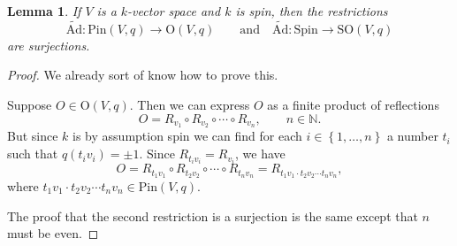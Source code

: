\documentclass[a4paper,10pt]{scrreprt}
\newcommand{\N}{\mathbb{N}}
\newcommand{\tAd}{\widetilde{\mathrm{Ad}}}
\newcommand{\Pin}{\mathrm{Pin}}
\newcommand{\Spin}{\mathrm{Spin}}
\newcommand{\Or}{\mathrm{O}}
\newcommand{\SO}{\mathrm{SO}}
\theoremstyle{definition}
\theoremstyle{plain}
\newtheorem{lemma}{Lemma}[section]
\theoremstyle{remark}
\begin{document}
\begin{lemma}
  If $V$ is a $k$-vector space and $k$ is spin, then the restrictions
  \begin{equation*}
    \tAd\colon \Pin(V, q) \to \Or(V, q)\qquad\text{and}\quad \tAd\colon \Spin \to \SO(V, q)
  \end{equation*}
  are surjections.
\end{lemma}
\begin{proof}
  We already sort of know how to prove this.

  Suppose $O \in \Or(V, q)$. Then we can express $O$ as a finite product of reflections
  \begin{equation*}
    O = R_{v_{1}} \circ R_{v_{2}} \circ \cdots \circ R_{v_{n}},\qquad n \in \N.
  \end{equation*} 
  But since $k$ is by assumption spin we can find for each $i \in \left\{ 1, \ldots, n \right\}$ a number $t_{i}$ such that $q(t_{i} v_{i}) = \pm 1$. Since $R_{t_{i} v_{i}} = R_{v_{i}}$, we have
  \begin{equation*}
    O = R_{t_{1} v_{1}} \circ R_{t_{2} v_{2}} \circ \cdots \circ R_{t_{n} v_{n}} = R_{t_{1} v_{1} \cdot t_{2} v_{2} \cdots t_{n} v_{n}},
  \end{equation*}
  where $t_{1} v_{1} \cdot t_{2} v_{2} \cdots t_{n} v_{n} \in \Pin(V, q)$.

  The proof that the second restriction is a surjection is the same except that $n$ must be even.
\end{proof}
\end{document}
